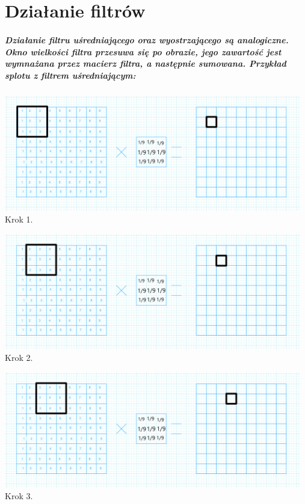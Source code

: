 \documentclass[a4paper,12pt,openany]{report}
\begin{document}
\chapter{Działanie filtrów}

\paragraph{\indent Działanie filtru uśredniającego oraz wyostrzającego są analogiczne. Okno wielkości filtra przesuwa się po obrazie, jego zawartość jest wymnażana przez macierz filtra, a następnie sumowana. Przykład splotu z filtrem uśredniającym:}

\begin{center}
\includegraphics[width=13cm]{resources/blur1.png}
\linebreak
\tiny{Krok 1.}
\end{center}

\begin{center}
\includegraphics[width=13cm]{resources/blur2.png}
\linebreak
\tiny{Krok 2.}
\end{center}

\begin{center}
\includegraphics[width=13cm]{resources/blur3.png}
\linebreak
\tiny{Krok 3.}
\end{center}
\end{document}
